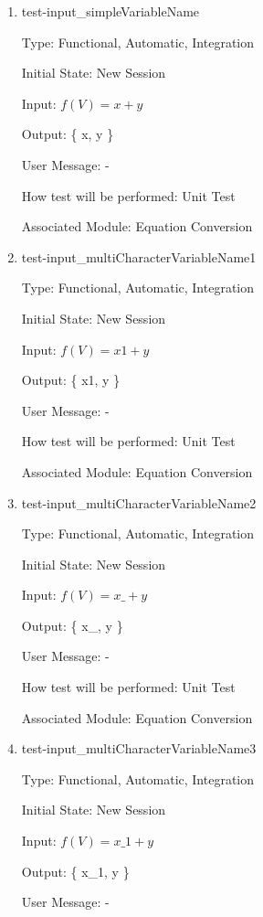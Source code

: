 \documentclass[12pt, titlepage]{article}
\begin{document}
\begin{enumerate}
	
	\item{test-input\_simpleVariableName}
	
	Type: Functional, Automatic, Integration
	
	Initial State: New Session
	
	Input: $f(V) = x + y$
	
	Output: \{ x, y \}
	
	User Message: - 
	
	How test will be performed: Unit Test
	
	Associated Module: Equation Conversion\\
	
	\item{test-input\_multiCharacterVariableName1}
	
	Type: Functional, Automatic, Integration
	
	Initial State: New Session
	
	Input: $f(V) = x1 + y$
	
	Output: \{ x1, y \}
	
	User Message: - 
	
	How test will be performed: Unit Test
	
	Associated Module: Equation Conversion\\
	
	\item{test-input\_multiCharacterVariableName2}
	
	Type: Functional, Automatic, Integration
	
	Initial State: New Session
	
	Input: $f(V) = x\_ + y$
	
	Output: \{ x\_, y \}
	
	User Message: - 
	
	How test will be performed: Unit Test
	
	Associated Module: Equation Conversion\\
	
	\item{test-input\_multiCharacterVariableName3}
	
	Type: Functional, Automatic, Integration
	
	Initial State: New Session
	
	Input: $f(V) = x\_1 + y$
	
	Output: \{ x\_1, y \}
	
	User Message: - 
	

\end{enumerate}
\end{document}
